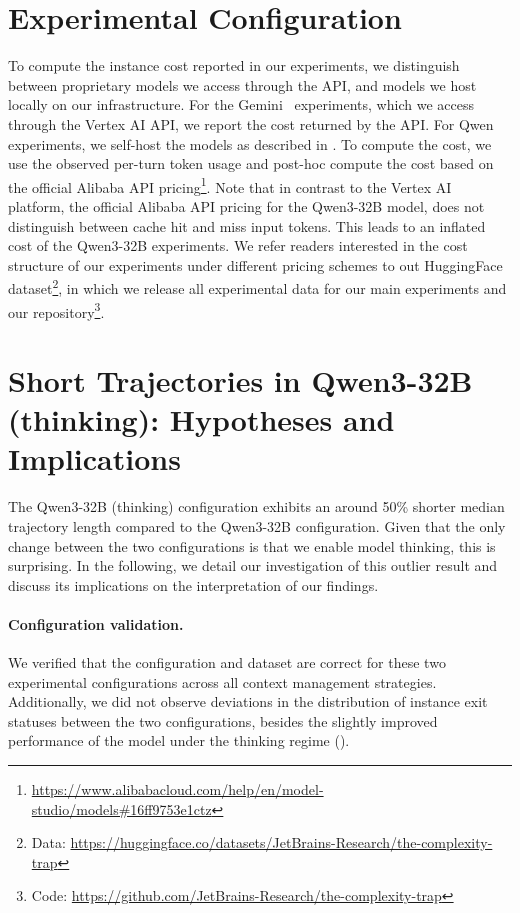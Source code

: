 \documentclass{article}
\begin{document}
\section{Experimental Configuration}
\label{appendix:experimental-config}
To compute the instance cost reported in our experiments, we distinguish between proprietary models we access through the API, and models we host locally on our infrastructure. For the Gemini~\cite{comanici_gemini_2025} experiments, which we access through the Vertex AI API, we report the cost returned by the API. For Qwen~\cite{qwen3technicalreport,hui2024qwen2} experiments, we self-host the models as described in . To compute the cost, we use the observed per-turn token usage and post-hoc compute the cost based on the official Alibaba API pricing\footnote{ \url{https://www.alibabacloud.com/help/en/model-studio/models\#16ff9753e1ctz}}. Note that in contrast to the Vertex AI platform, the official Alibaba API pricing for the Qwen3-32B model, does not distinguish between cache hit and miss input tokens. This leads to an inflated cost of the Qwen3-32B experiments. We refer readers interested in the cost structure of our experiments under different pricing schemes to out HuggingFace dataset\footnote{Data: \url{https://huggingface.co/datasets/JetBrains-Research/the-complexity-trap}}, in which we release all experimental data for our main experiments and our repository\footnote{Code: \url{https://github.com/JetBrains-Research/the-complexity-trap}}.



\section{Short Trajectories in Qwen3-32B (thinking): Hypotheses and Implications}
\label{sec:short-traj-qwen32-thinking}
The Qwen3-32B (thinking) configuration exhibits an around 50\% shorter median trajectory length compared to the Qwen3-32B configuration. Given that the only change between the two configurations is that we enable model thinking, this is surprising. In the following, we detail our investigation of this outlier result and discuss its implications on the interpretation of our findings.

\paragraph{Configuration validation.} We verified that the configuration and dataset are correct for these two experimental configurations across all context management strategies. Additionally, we did not observe deviations in the distribution of instance exit statuses between the two configurations, besides the slightly improved performance of the model under the thinking regime (). 
\end{document}
